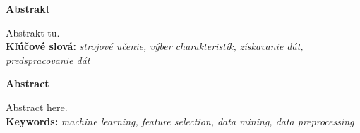 {\noindent\large\bf Abstrakt}

\vspace{1.8cm}

Abstrakt tu.
\\

{\parindent0pt \textbf{Kľúčové slová:} \emph{strojové učenie, výber charakteristík, získavanie dát, predspracovanie dát}} 

\newpage
 {\noindent\large\bf Abstract}
  \vspace{1.8cm}
 

Abstract here.
\\

{\parindent0pt \textbf{Keywords:} \emph{machine learning, feature selection, data mining, data preprocessing}}


\newpage
